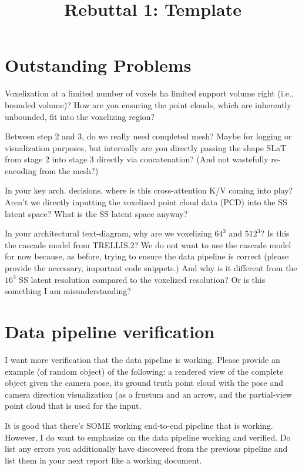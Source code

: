 \title{Rebuttal 1: Template}

\maketitle

\section{Outstanding Problems}

Voxelization at a limited number of voxels ha limited support volume right (i.e., bounded volume)? How are you ensuring the point clouds, which are inherently unbounded, fit into the voxelizing region?

Between step 2 and 3, do we really need completed mesh? Maybe for logging or visualization purposes, but internally are you directly passing the shape SLaT from stage 2 into stage 3 directly via concatenation? (And not wastefully re-encoding from the mesh?)

In your key arch. decisions, where is this cross-attention K/V coming into play? Aren't we directly inputting the voxelized point cloud data (PCD) into the SS latent space? What is the SS latent space anyway?

In your architectural text-diagram, why are we voxelizing $64^3$ and $512^3$? Is this the cascade model from TRELLIS.2? We do not want to use the cascade model for now because, as before, trying to ensure the data pipeline is correct (please provide the necessary, important code snippets.) And why is it different from the $16^3$ SS latent resolution compared to the voxelized resolution? Or is this something I am misunderstanding?

\section{Data pipeline verification}

I want more verification that the data pipeline is working. Please provide an example (of random object) of the following: a rendered view of the complete object given the camera pose, its ground truth point cloud with the pose and camera direction visualization (as a frustum and an arrow, and the partial-view point cloud that is used for the input.

It is good that there's SOME working end-to-end pipeline that is working. However, I do want to emphasize on the data pipeline working and verified. Do list any errors you additionally have discovered from the previous pipeline and list them in your next report like a working document.

